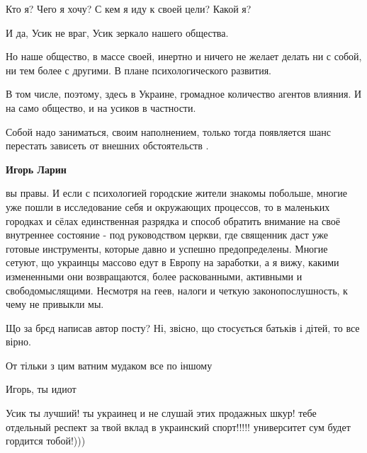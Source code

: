 \begin{itemize}
\begin{itemize}
Кто я? Чего я хочу? С кем я иду к своей цели? Какой я?

И да, Усик не враг, Усик зеркало нашего общества.

Но наше общество, в массе своей, инертно и ничего не желает делать ни с собой,
ни тем более с другими. В плане психологического развития.

В том числе, поэтому, здесь в Украине, громадное количество агентов влияния. И
на само общество, и на усиков в частности.

Собой надо заниматься, своим наполнением, только тогда появляется шанс
перестать зависеть от внешних обстоятельств .

\textbf{Игорь Ларин} 

вы правы. И если с психологией городские жители знакомы побольше, многие уже
пошли в исследование себя и окружающих процессов, то в маленьких городках и
сёлах единственная разрядка и способ обратить внимание на своё внутреннее
состояние - под руководством церкви, где священник даст уже готовые
инструменты, которые давно и успешно предопределены. Многие сетуют, що украинцы
массово едут в Европу на заработки, а я вижу, какими измененными они
возвращаются, более раскованными, активными и свободомыслящими. Несмотря на
геев, налоги и четкую законопослушность, к чему не привыкли мы.

\end{itemize} %


Що за брєд написав автор посту? Ні, звісно, що стосується батьків і дітей, то все вірно.

От тільки з цим ватним мудаком все по іншому

Игорь, ты идиот


Усик ты лучший! ты украинец и не слушай этих продажных шкур! тебе отдельный
респект за твой вклад в украинский спорт!!!!! университет сум будет гордится
тобой!)))

\end{itemize} %

